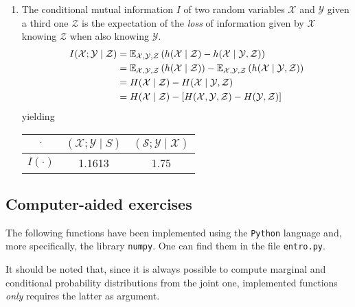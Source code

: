 \documentclass[a4paper, 12pt]{article}
\renewcommand{\S}{\mathcal{S}}
\newcommand{\X}{\mathcal{X}}
\newcommand{\Y}{\mathcal{Y}}
\newcommand{\Z}{\mathcal{Z}}
\begin{document}
\begin{enumerate}[leftmargin=*]
\begin{table}[H]
\begin{tabular}{c|cccc}
            \end{tabular}
            \label{tab:mutual_information}
        \end{table}
        \item The conditional mutual information $I$ of two random variables $\X$ and $\Y$ given a third one $\Z$ is the expectation of the \emph{loss} of information given by $\X$ knowing $\Z$ when also knowing $\Y$.
        \begin{align}
            I(\X; \Y \mid \Z) & = \mathbb{E}_{\X, \Y, \Z} \rbk{h(\X \mid \Z) - h(\X \mid \Y, \Z)} \nonumber \\
            & = \mathbb{E}_{\X, \Y, \Z} \rbk{h(\X \mid \Z)} - \mathbb{E}_{\X, \Y, \Z} \rbk{h(\X \mid \Y, \Z)} \nonumber \\
            & = H(\X \mid \Z) - H(\X \mid \Y, \Z) \nonumber \\
            & = H(\X \mid \Z) - \sbk{H(\X, \Y, \Z) - H(\Y, \Z)} \label{eq:conditional_mutual_information}
        \end{align}
        yielding
        \begin{table}[H]
            \centering
            \begin{tabular}{c|cc}
                $\cdot$ & $(\X; \Y \mid S)$ & $(\S; \Y \mid \X)$  \\ \hline
                $I(\cdot)$ & \num{1.1613} & \num{1.75} \\
            \end{tabular}
            \label{tab:conditional_mutual_information}
        \end{table}
    \end{enumerate}
    
    \subsection*{Computer-aided exercises}
    
    The following functions have been implemented using the \texttt{Python} language and, more specifically, the library \texttt{numpy}. One can find them in the file \texttt{entro.py}.
    
    It should be noted that, since it is always possible to compute marginal and conditional probability distributions from the joint one, implemented functions \emph{only} requires the latter as argument.
    
\end{document}

